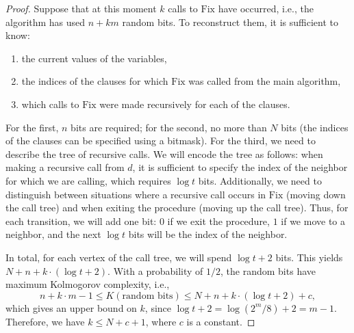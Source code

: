 \documentclass[12pt,sans]{article}
\theoremstyle{definition}
\theoremstyle{plain}
\theoremstyle{remark}
\begin{document}
\begin{proof}
    Suppose that at this moment $k$ calls to $\mathrm{Fix}$ have occurred, i.e., the algorithm
    has used $n + km$ random bits. To reconstruct them, it is sufficient to know:
    \begin{enumerate}
        \item the current values of the variables,
        \item the indices of the clauses for which $\mathrm{Fix}$ was called from the main algorithm,
        \item which calls to $\mathrm{Fix}$ were made recursively for each of the clauses.
    \end{enumerate}
    For the first, $n$ bits are required; for the second, no more than $N$ bits (the indices of the clauses can
    be specified using a bitmask). For the third, we need to describe the tree of recursive calls.
    We will encode the tree as follows: when making a recursive call from $d$, it is sufficient to specify
    the index of the neighbor for which we are calling, which requires $\log t$ bits. Additionally,
    we need to distinguish between situations where a recursive call occurs in $\mathrm{Fix}$
    (moving down the call tree) and when exiting the procedure (moving up the call tree).
    Thus, for each transition, we will add one bit: $0$ if we exit the procedure,
    $1$ if we move to a neighbor, and the next $\log t$ bits will be the index of the neighbor.

    In total, for each vertex of the call tree, we will spend $\log t + 2$ bits. This yields $N + n + k\cdot(\log t + 2)$.
    With a probability of $1/2$, the random bits have maximum Kolmogorov complexity, i.e.,
    \[
    n+k\cdot m - 1 \le K(\text{random bits}) \le N + n + k\cdot(\log t + 2) + c,
    \]
    which gives an upper bound on $k$, since $\log t + 2 = \log (2^m/8) + 2 = m - 1$.
    Therefore, we have $k \le N + c + 1$, where $c$ is a constant.
\end{proof}
\end{document}
